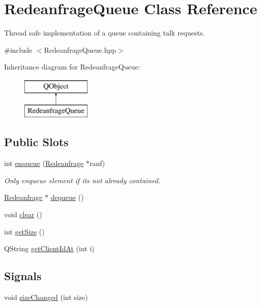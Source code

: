 \hypertarget{class_redeanfrage_queue}{}\section{Redeanfrage\+Queue Class Reference}
\label{class_redeanfrage_queue}


Thread safe implementation of a queue containing talk requests.  




{\ttfamily \#include $<$Redeanfrage\+Queue.\+hpp$>$}

Inheritance diagram for Redeanfrage\+Queue\+:\begin{figure}[H]
\begin{center}
\leavevmode
\includegraphics[height=2.000000cm]{class_redeanfrage_queue}
\end{center}
\end{figure}
\subsection*{Public Slots}
\begin{DoxyCompactItemize}
\item 
int \hyperlink{class_redeanfrage_queue_a9b32770072823dab226e4f8d9ea8a0e9}{enqueue} (\hyperlink{class_redeanfrage}{Redeanfrage} $\ast$ranf)
\begin{DoxyCompactList}\small\item\em Only enqueue element if its not already contained. \end{DoxyCompactList}\item 
\hyperlink{class_redeanfrage}{Redeanfrage} $\ast$ \hyperlink{class_redeanfrage_queue_a23cb67060c346c6b3eba739f933c52ab}{dequeue} ()
\item 
void \hyperlink{class_redeanfrage_queue_a4393b8ece223968dcd4fe4287984a297}{clear} ()
\item 
int \hyperlink{class_redeanfrage_queue_a927d85c9cb5dfc455da935459766e699}{get\+Size} ()
\item 
Q\+String \hyperlink{class_redeanfrage_queue_a19c10f8da883a952728af9d5e16de18e}{get\+Client\+Id\+At} (int i)
\end{DoxyCompactItemize}
\subsection*{Signals}
\begin{DoxyCompactItemize}
\item 
void \hyperlink{class_redeanfrage_queue_a3df3def473ea6e01418692d30a4f6e29}{size\+Changed} (int size)
\end{DoxyCompactItemize}
